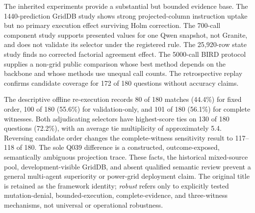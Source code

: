 \documentclass[applsci,article,submit,moreauthors]{Definitions/mdpi}
\begin{document}
The inherited experiments provide a substantial but bounded evidence base. The 1440-prediction GridDB study shows strong projected-column instruction uptake but no primary execution effect surviving Holm correction. The 700-call component study supports presented values for one Qwen snapshot, not Granite, and does not validate its selector under the registered rule. The 25,920-row state study finds no corrected factorial agreement effect. The 5000-call BIRD protocol supplies a non-grid public comparison whose best method depends on the backbone and whose methods use unequal call counts. The retrospective replay confirms candidate coverage for 172 of 180 questions without accuracy claims.

The descriptive offline re-execution records 80 of 180 matches (44.4\%) for fixed order, 100 of 180 (55.6\%) for validation-only, and 101 of 180 (56.1\%) for complete witnesses. Both adjudicating selectors have highest-score ties on 130 of 180 questions (72.2\%), with an average tie multiplicity of approximately 5.4. Reversing candidate order changes the complete-witness sensitivity result to 117--118 of 180. The sole Q039 difference is a constructed, outcome-exposed, semantically ambiguous projection trace. These facts, the historical mixed-source pool, development-visible GridDB, and absent qualified semantic review prevent a general multi-agent superiority or power-grid deployment claim. The original title is retained as the framework identity; \emph{robust} refers only to explicitly tested mutation-denial, bounded-execution, complete-evidence, and three-witness mechanisms, not universal or operational robustness.
\end{document}
